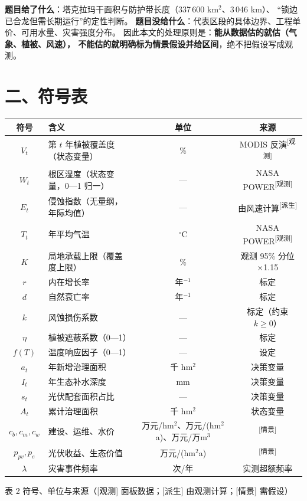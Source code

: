 \documentclass[11pt,a4paper]{ctexart}
\newcommand{\src}[1]{\textsuperscript{\scriptsize[#1]}}
\begin{document}
\textbf{题目给了什么}：塔克拉玛干面积与防护带长度（337\,600 km$^2$、3\,046 km）、
“锁边已合龙但需长期运行”的定性判断。
\textbf{题目没给什么}：代表区段的具体边界、工程单价、可用水量、灾害强度分布。
因此本文的处理原则是：\textbf{能从数据估的就估（气象、植被、风速），
不能估的就明确标为情景假设并给区间}，绝不把假设写成观测。

\section*{二、符号表}
\begin{table}[H]\centering\small\setlength{\parskip}{1pt}
\begin{tabularx}{\textwidth}{|c|X|c|c|}
\toprule
符号 & 含义 & 单位 & 来源 \\
\midrule
$V_t$ & 第 $t$ 年植被覆盖度（状态变量） & \% & MODIS 反演\src{观测} \\
$W_t$ & 根区湿度（状态变量，0—1 归一） & — & NASA POWER\src{观测} \\
$E_t$ & 侵蚀指数（无量纲，年际均值） & — & 由风速计算\src{派生} \\
$T_t$ & 年平均气温 & $^\circ$C & NASA POWER\src{观测} \\
$K$ & 局地承载上限（覆盖度上限） & \% & 观测 95\% 分位×1.15 \\
$r$ & 内在增长率 & 年$^{-1}$ & 标定 \\
$d$ & 自然衰亡率 & 年$^{-1}$ & 标定 \\
$k$ & 风蚀损伤系数 & — & 标定（约束 $k\ge0$） \\
$\eta$ & 植被遮蔽系数（0—1） & — & 标定 \\
$f(T)$ & 温度响应因子（0—1） & — & 设定 \\
$a_t$ & 年新增治理面积 & 千 hm$^2$ & 决策变量 \\
$I_t$ & 年生态补水深度 & mm & 决策变量 \\
$s_t$ & 光伏配套面积占比 & — & 决策变量 \\
$A_t$ & 累计治理面积 & 千 hm$^2$ & 状态变量 \\
$c_b,c_m,c_w$ & 建设、运维、水价 & 万元/hm$^2$、万元/(hm$^2$a)、万元/万m$^3$ & \src{情景} \\
$p_{pv},p_e$ & 光伏收益、生态价值 & 万元/(hm$^2$a) & \src{情景} \\
$\lambda$ & 灾害事件频率 & 次/年 & 实测超额频率 \\
\bottomrule
\end{tabularx}
\begin{center}\small 表 2  符号、单位与来源（[观测] 面板数据；[派生] 由观测计算；[情景] 需假设）\end{center}
\end{table}
\end{document}
